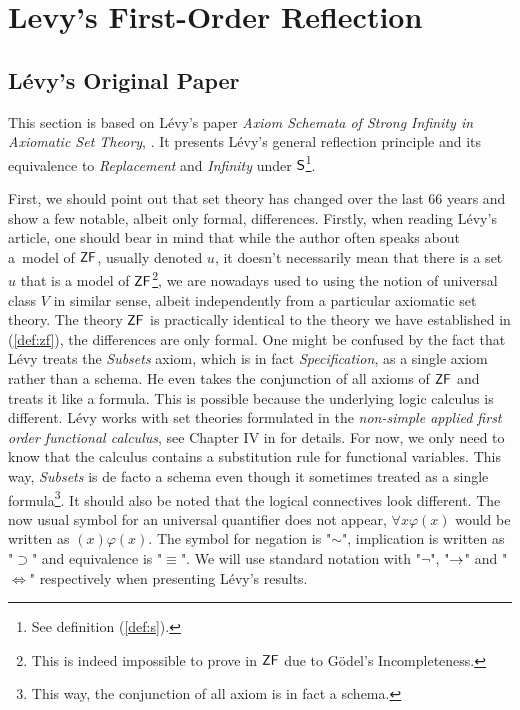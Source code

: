 \section{Levy's First-Order Reflection}\label{sec:first_order}

\subsection{Lévy's Original Paper}\label{sec:levy1960}
This section is based on Lévy's paper \emph{Axiom Schemata of Strong Infinity in Axiomatic Set Theory}, \cite{Levy60a}. It presents Lévy's general reflection principle and its equivalence to \emph{Replacement} and \emph{Infinity} under $\sf{S}$\footnote{See definition (\ref{def:s}).}.

First, we should point out that set theory has changed over the last 66 years and show a few notable, albeit only formal, differences. Firstly, when reading Lévy's article, one should bear in mind that while the author often speaks about a~model of $\sf{ZF}$, usually denoted $u$, it doesn't necessarily mean that there is a set $u$ that is a model of $\sf{ZF}$\footnote{This is indeed impossible to prove in $\sf{ZF}$ due to Gödel's Incompleteness.}, we are nowadays used to using the notion of universal class $V$ in similar sense, albeit independently from a particular axiomatic set theory. %
The theory $\sf{ZF}$ is practically identical to the theory we have established in (\ref{def:zf}), the differences are only formal.
One might be confused by the fact that Lévy treats the \emph{Subsets} axiom, which is in fact \emph{Specification}, as a single axiom rather than a schema. He even takes the conjunction of all axioms of $\sf{ZF}$ and treats it like a formula.  This is possible because the underlying logic calculus is different. Lévy works with set theories formulated in the \emph{non-simple applied first order functional calculus}, see Chapter IV in \cite{church1996introduction} for details. For now, we only need to know that the calculus contains a substitution rule for functional variables. This way, \emph{Subsets} is de facto a schema even though it sometimes treated as a single formula\footnote{This way, the conjunction of all axiom is in fact a schema.}.
It should also be noted that the logical connectives look different. The now usual symbol for an universal quantifier does not appear, $\forall x \varphi (x)$ would be written as $(x) \varphi (x)$. The symbol for negation is "$\sim$", implication is written as "$\supset$" and equivalence is "$\equiv$". We will use standard notation with "$\neg$", "$\rightarrow$" and "$\iff$" respectively when presenting Lévy's results.

